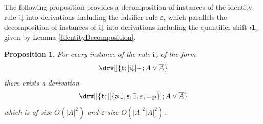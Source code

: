 \documentclass[10pt]{article}
\newtheorem{proposition}[theorem]{Proposition}
\theoremstyle{definition}\newtheorem{remark}[theorem]{Remark}
\theoremstyle{definition}\newtheorem{example}[theorem]{Example}
\theoremstyle{definition}\newtheorem{definition}[theorem]{Definition}
\newcommand{\aiDown}{{\mathsf{ai\mathord\downarrow}}}
\newcommand{\iDown}{{\mathsf{i\mathord\downarrow}}}
\newcommand{\switch}{{\mathsf{s}}}
\newcommand{\rOneDown}{{\mathsf{r1\mathord\downarrow}}}
\newcommand{\falsifierRule}{{\mathsf{\varepsilon}}}
\newcommand{\eqProp}{=_{\textbf{P}}}
\newcommand{\trueUnit}{\mathsf{t}}
\begin{document}
	The following proposition provides a decomposition of instances of the identity rule $\iDown$ into derivations including the falsifier rule $\falsifierRule$, which parallels the decomposition of instances of $\iDown$ into derivations including the quantifier-shift $\rOneDown$ given by Lemma \ref{IdentityDecomposition}.
	
	\begin{proposition}\label{IdentityFalsifierDecomposition}
		For every instance of the rule $\iDown$ of the form
		\[
			\drv[] {
				\trueUnit ; [\iDown]- ; A \lor \overline{A}
			}
		\]
		there exists a derivation
		\[
			\drv[] {
				\trueUnit ; |[\{\aiDown, \switch, \exists, \falsifierRule, \eqProp\}] ; A \lor \overline{A}
			}
		\]
		which is of size $O(| A |^2)$ and $\varepsilon$-size $O(| A |^2 | A |_\varepsilon^2)$.
	\end{proposition}
\end{document}
